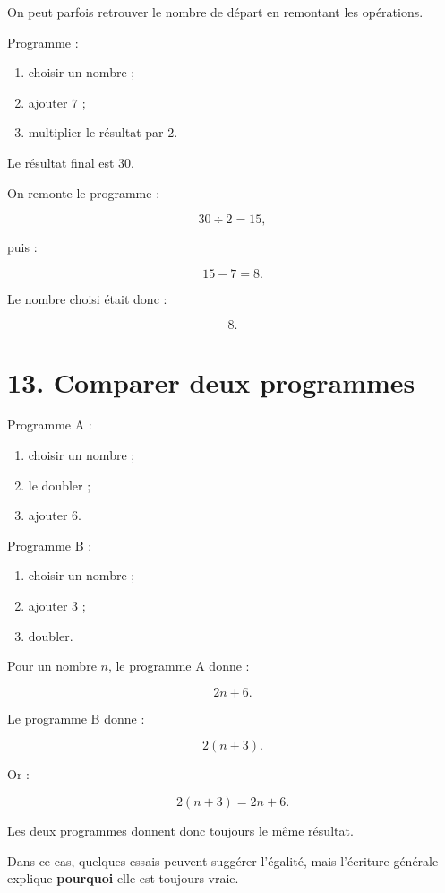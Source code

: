 On peut parfois retrouver le nombre de départ en remontant les opérations.

Programme :

\begin{enumerate}
\item choisir un nombre ;
\item ajouter $7$ ;
\item multiplier le résultat par $2$.
\end{enumerate}

Le résultat final est $30$.

On remonte le programme :

\[
30\div2=15,
\]

puis :

\[
15-7=8.
\]

Le nombre choisi était donc :

\[
\boxed{8}.
\]

\section{13. Comparer deux programmes}

Programme A :

\begin{enumerate}
\item choisir un nombre ;
\item le doubler ;
\item ajouter $6$.
\end{enumerate}

Programme B :

\begin{enumerate}
\item choisir un nombre ;
\item ajouter $3$ ;
\item doubler.
\end{enumerate}

Pour un nombre $n$, le programme A donne :

\[
2n+6.
\]

Le programme B donne :

\[
2(n+3).
\]

Or :

\[
2(n+3)=2n+6.
\]

Les deux programmes donnent donc toujours le même résultat.

Dans ce cas, quelques essais peuvent suggérer l’égalité, mais l’écriture générale explique \textbf{pourquoi} elle est toujours vraie.


